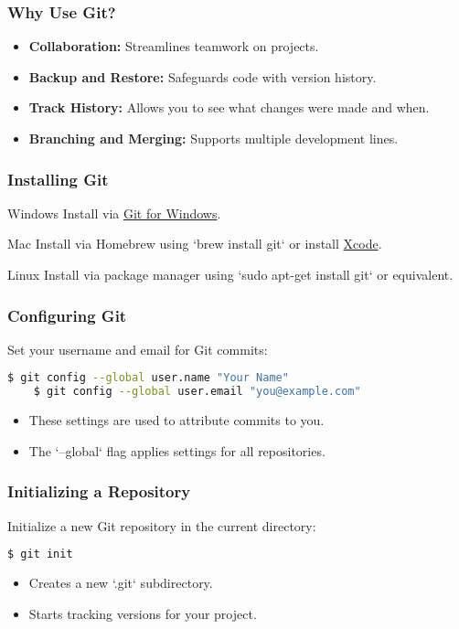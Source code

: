 \begin{frame}
	\frametitle{Why Use Git?}
	\begin{itemize}
		\item \textbf{Collaboration:} Streamlines teamwork on projects.
		\item \textbf{Backup and Restore:} Safeguards code with version history.
		\item \textbf{Track History:} Allows you to see what changes were made and when.
		\item \textbf{Branching and Merging:} Supports multiple development lines.
	\end{itemize}
\end{frame}

\begin{frame}
	\frametitle{Installing Git}
	\begin{block}{Windows}
		Install via \href{https://git-scm.com/download/win}{Git for Windows}.
	\end{block}
	\begin{block}{Mac}
		Install via Homebrew using `brew install git` or install \href{https://developer.apple.com/xcode/}{Xcode}.
	\end{block}
	\begin{block}{Linux}
		Install via package manager using `sudo apt-get install git` or equivalent.
	\end{block}
\end{frame}

\begin{frame}[fragile]
	\frametitle{Configuring Git}
	Set your username and email for Git commits:
	\begin{lstlisting}[language=bash]
	$ git config --global user.name "Your Name"
	$ git config --global user.email "you@example.com"
	\end{lstlisting}
	\begin{itemize}
		\item These settings are used to attribute commits to you.
		\item The `--global` flag applies settings for all repositories.
	\end{itemize}
\end{frame}


\begin{frame}[fragile]
	\frametitle{Initializing a Repository}
	Initialize a new Git repository in the current directory:
	\begin{lstlisting}[language=bash]
	$ git init
	\end{lstlisting}
	\begin{itemize}
		\item Creates a new `.git` subdirectory.
		\item Starts tracking versions for your project.
	\end{itemize}
\end{frame}

